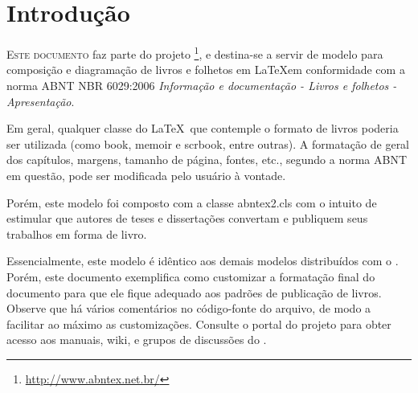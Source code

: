 \documentclass[
	12pt,				%
	openright,			%
	twoside,			%
	b5paper,			%
	english,			%
	french,				%
	brazil,				%
	sumario=tradicional
]{abntex2}
\begin{document}


\listoffigures*
\cleardoublepage

\listoftables*
\cleardoublepage

\tableofcontents*
\cleardoublepage

\mainmatter

\chapter*[Introdução]{Introdução}

\lettrine[nindent=0.35em,lhang=0.40,loversize=0.3]{E}{ste documento} faz parte
do projeto \abnTeX\footnote{\url{http://www.abntex.net.br/}}, e destina-se
a servir de modelo para composição e diagramação de livros e folhetos em
\LaTeX em conformidade com a norma ABNT NBR 6029:2006 \emph{Informação e
documentação - Livros e folhetos - Apresentação}.

Em geral, qualquer classe do \LaTeX\ que contemple o formato de livros poderia
ser utilizada (como \textsf{book}, \textsf{memoir} e \textsf{scrbook}, entre
outras). A formatação de geral dos capítulos, margens, tamanho de página,
fontes, etc., segundo a norma ABNT em questão, pode ser modificada pelo usuário
à vontade.

Porém, este modelo foi composto com a classe \textsf{abntex2.cls} com o intuito
de estimular que autores de teses e dissertações convertam e publiquem seus
trabalhos em forma de livro.

Essencialmente, este modelo é idêntico aos demais modelos distribuídos com o
\abnTeX. Porém, este documento exemplifica como customizar a formatação final do
documento para que ele fique adequado aos padrões de publicação de livros.
Observe que há vários comentários no código-fonte do arquivo, de modo a
facilitar ao máximo as customizações. Consulte o portal do projeto para obter
acesso aos manuais, wiki, e grupos de discussões do \abnTeX.
\end{document}
